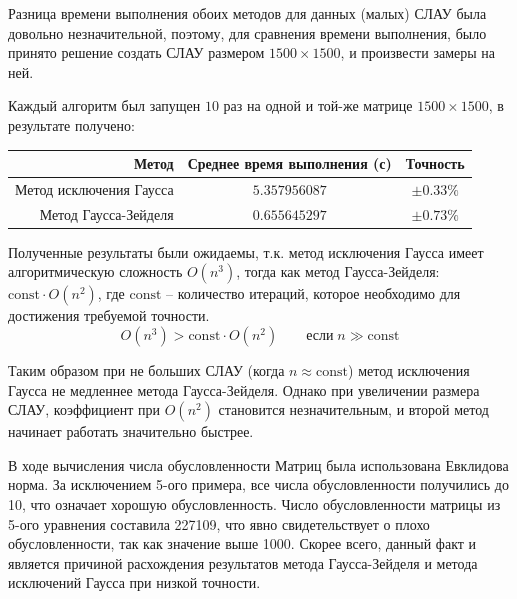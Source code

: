 \documentclass[a4paper]{article}
\begin{document}
\bigskip

Разница времени выполнения обоих методов для данных (малых) СЛАУ была довольно незначительной, поэтому, для сравнения времени выполнения, было принято решение создать СЛАУ размером $1500 \times 1500$, и произвести замеры на ней.

Каждый алгоритм был запущен $10$ раз на одной и той-же матрице $1500 \times 1500$, в результате получено:
\begin{center}
    \begin{tabular}{r|cc}
        Метод & Среднее время выполнения (с) & Точность \\
        \hline
        Метод исключения Гаусса & $5.357956087$ & $\pm 0.33\%$ \\
        Метод Гаусса-Зейделя    & $0.655645297$ & $\pm 0.73\%$ \\
    \end{tabular}
\end{center}

Полученные результаты были ожидаемы, т.к. метод исключения Гаусса имеет алгоритмическую сложность $O(n^3)$, тогда как метод Гаусса-Зейделя: $\mathrm{const} \cdot O(n^2)$, где $\mathrm{const}$ -- количество итераций, которое необходимо для достижения требуемой точности.
\begin{equation*}
    O(n^3) > \mathrm{const} \cdot O(n^2) \qquad \text{если} \; n \gg \mathrm{const}
\end{equation*}

Таким образом при не больших СЛАУ (когда $n \approx \mathrm{const}$) метод исключения Гаусса не медленнее метода Гаусса-Зейделя. Однако при увеличении размера СЛАУ, коэффициент при $O(n^2)$ становится незначительным, и второй метод начинает работать значительно быстрее.

\bigskip

В ходе вычисления числа обусловленности Матриц была использована Евклидова норма. За исключением 5-ого примера, все числа обусловленности получились до 10, что означает хорошую обусловленность.
Число обусловленности матрицы из 5-ого уравнения составила 227109, что явно свидетельствует о плохо обусловленности, так как значение выше 1000. Скорее всего, данный факт и является причиной расхождения результатов метода Гаусса-Зейделя и метода исключений Гаусса при низкой точности.
\end{document}

